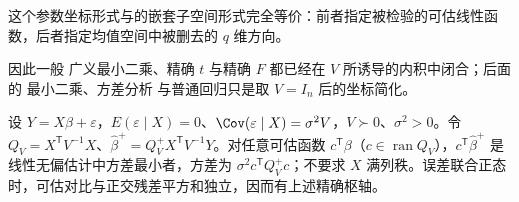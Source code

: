 这个参数坐标形式与的嵌套子空间形式完全等价：前者指定被检验的可估线性函数，后者指定均值空间中被删去的 $q$ 维方向。

因此一般 广义最小二乘、精确 $t$ 与精确 $F$ 都已经在 $V$ 所诱导的内积中闭合；后面的 最小二乘、方差分析 与普通回归只是取 $V=I_n$ 后的坐标简化。

\begin{proposition}
设 $Y=X\beta+\varepsilon$，$E(\varepsilon\mid X)=0$、$\Cov(\varepsilon\mid X)=\sigma^2V$，$V\succ0$、$\sigma^2>0$。令 $Q_V=X^{\mathsf T}V^{-1}X$、$\widehat\beta^+=Q_V^+X^{\mathsf T}V^{-1}Y$。对任意可估函数 $c^{\mathsf T}\beta$（$c\in\operatorname{ran}Q_V$），$c^{\mathsf T}\widehat\beta^+$ 是线性无偏估计中方差最小者，方差为 $\sigma^2c^{\mathsf T}Q_V^+c$；不要求 $X$ 满列秩。误差联合正态时，可估对比与正交残差平方和独立，因而有上述精确枢轴。
\end{proposition}

